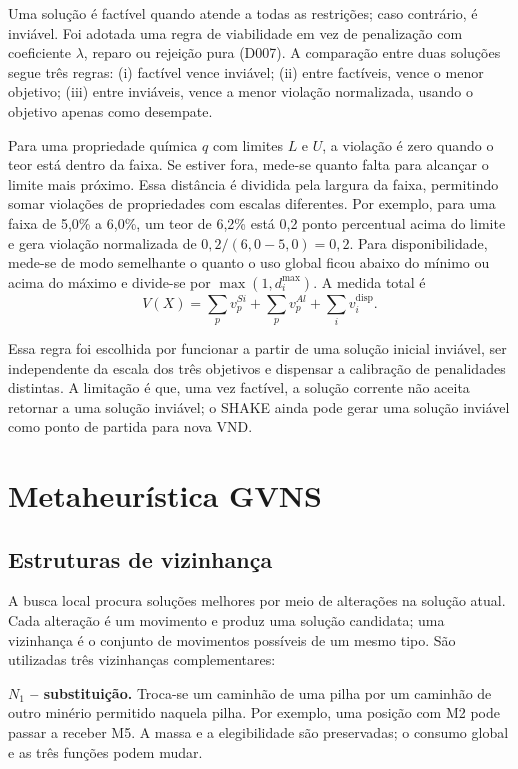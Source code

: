 \documentclass[10pt,twocolumn,a4paper]{article}
\begin{document}
Uma solução é factível quando atende a todas as restrições; caso contrário, é inviável. Foi adotada uma regra de viabilidade em vez de penalização com coeficiente $\lambda$, reparo ou rejeição pura (D007). A comparação entre duas soluções segue três regras: (i) factível vence inviável; (ii) entre factíveis, vence o menor objetivo; (iii) entre inviáveis, vence a menor violação normalizada, usando o objetivo apenas como desempate.

Para uma propriedade química $q$ com limites $L$ e $U$, a violação é zero quando o teor está dentro da faixa. Se estiver fora, mede-se quanto falta para alcançar o limite mais próximo. Essa distância é dividida pela largura da faixa, permitindo somar violações de propriedades com escalas diferentes. Por exemplo, para uma faixa de 5,0\% a 6,0\%, um teor de 6,2\% está 0,2 ponto percentual acima do limite e gera violação normalizada de $0{,}2/(6{,}0-5{,}0)=0{,}2$. Para disponibilidade, mede-se de modo semelhante o quanto o uso global ficou abaixo do mínimo ou acima do máximo e divide-se por $\max(1,d_i^{\max})$. A medida total é
\begin{equation}
V(X) = \sum_{p} v_p^{Si} + \sum_{p} v_p^{Al} + \sum_{i} v_i^{\text{disp}}.
\end{equation}

Essa regra foi escolhida por funcionar a partir de uma solução inicial inviável, ser independente da escala dos três objetivos e dispensar a calibração de penalidades distintas. A limitação é que, uma vez factível, a solução corrente não aceita retornar a uma solução inviável; o SHAKE ainda pode gerar uma solução inviável como ponto de partida para nova VND.

\section{Metaheurística GVNS}

\subsection{Estruturas de vizinhança}

A busca local procura soluções melhores por meio de alterações na solução atual. Cada alteração é um movimento e produz uma solução candidata; uma vizinhança é o conjunto de movimentos possíveis de um mesmo tipo. São utilizadas três vizinhanças complementares:

\noindent\textbf{$N_1$ -- substituição.} Troca-se um caminhão de uma pilha por um caminhão de outro minério permitido naquela pilha. Por exemplo, uma posição com M2 pode passar a receber M5. A massa e a elegibilidade são preservadas; o consumo global e as três funções podem mudar.
\end{document}
